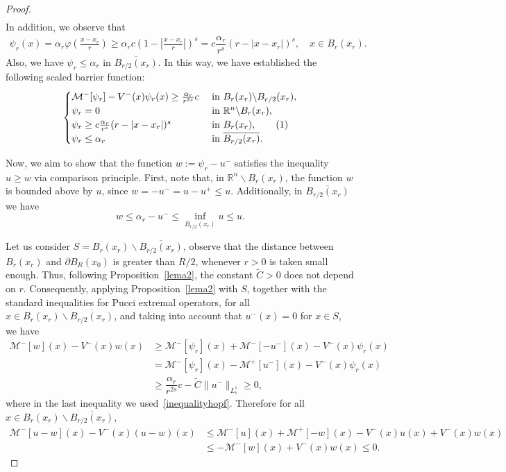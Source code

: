 \documentclass[11pt]{article}
\newcommand\numberthis{\addtocounter{equation}{1}\tag{\theequation}}
\begin{document}
\begin{proof}
\begin{align*}
\end{align*}
In addition, we observe that
\begin{align*}
    \psi_{r}(x)=\alpha_{r}\varphi\left(\frac{x-x_{r}}{r}\right) \geq \alpha_{r}c\left(1-\left|\frac{x-x_{r}}{r}\right|\right)^{s} = c\dfrac{\alpha_r}{r^{s}}\left( r-|x-x_r|\right)^{s},\quad x\in B_{r}(x_r).
\end{align*}
Also, we have \(\psi_r \leq \alpha_r\) in \(\overline{B_{r/2}(x_r)}\). In this way, we have established the following scaled barrier function:
\begin{equation}
\begin{cases}
    \mathcal{M}^{-}[\psi_r] - V^{-}(x)\psi_{r}(x) \geq \frac{\alpha_r}{r^{2s}}c & \text{ in } B_{r}(x_r) \backslash B_{r/2}(x_r), \nonumber\\ 
    \psi_r = 0 & \text{ in } \mathbb{R}^{n} \backslash B_{r}(x_r), \nonumber\\
    \psi_r \geq c\frac{\alpha_r}{r^s}(r-|x-x_r|)^{s} & \text{ in } B_{r}(x_r), \numberthis \label{scaling}\\
    \psi_r \leq \alpha_r & \text{ in } \overline{B_{r/2}(x_r)}. 
\end{cases}
\end{equation}

Now, we aim to show that the function \(w := \psi_r - u^{-}\) satisfies the inequality \(u \geq w\) via comparison principle. First, note that, in \(\mathbb{R}^{n}\backslash B_{r}(x_{r})\), the function \(w\) is bounded above by \(u\), since $w = - u^{-} = u - u^{+} \leq u.$ Additionally, in \(\overline{B_{r/2}(x_r)}\) we have \[w \leq \alpha_r - u^{-} \leq \inf_{B_{r/2}(x_r)}u \leq u.\]

Let us consider \(S = B_{r}(x_r) \backslash\overline{B_{r/2}(x_r)}\), observe that the distance between \(B_{r}(x_r)\) and \(\partial B_{R}(x_0)\) is greater than \(R/2\), whenever \(r>0\) is taken small enough. Thus, following Proposition~\ref{lema2}, the constant \(\widetilde{C}>0\) does not depend on \(r\). Consequently, applying Proposition~\ref{lema2} with \(S\), together with the standard inequalities for Pucci extremal operators, for all \(x\in B_{r}(x_r) \backslash\overline{B_{r/2}(x_r)}\), and taking into account that \(u^{-}(x)=0\) for \(x\in S\), we have
\begin{align*}
    \mathcal{M}^{-}[w](x) - V^{-}(x)w(x) &\geq \mathcal{M}^{-}[\psi_r](x) + \mathcal{M}^{-}[-u^{-}](x) - V^{-}(x)\psi_{r}(x) \\
    &= \mathcal{M}^{-}[\psi_r](x) - \mathcal{M}^{+}[u^{-}](x) - V^{-}(x)\psi_{r}(x)\\
    &\geq \dfrac{\alpha_r}{r^{2s}}c - \widetilde{C}\|u^{-}\|_{L^{1}_{s}} \geq 0,
\end{align*}
where in the last inequality we used~\eqref{inequalityhopf}.
Therefore for all \(x\in B_{r}(x_r) \backslash\overline{B_{r/2}(x_r)}\),
\begin{align*}
    \mathcal{M}^{-}[u-w](x) - V^{-}(x)(u-w)(x) &\leq \mathcal{M}^{-}[u](x) + \mathcal{M}^{+}[-w](x) - V^{-}(x)u(x) + V^{-}(x)w(x) \\
    &\leq -\mathcal{M}^{-}[w](x) + V^{-}(x)w(x) \leq 0.
\end{align*}


\end{proof}
\end{document}
